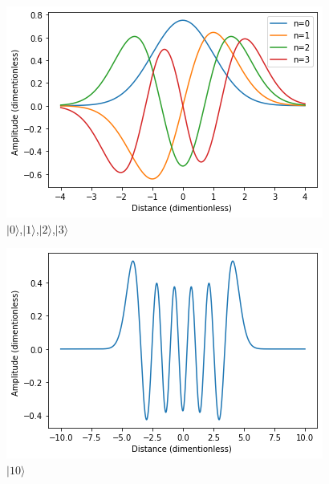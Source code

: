 \documentclass{article}
\begin{document}
\begin{figure}
    \centering
    \includegraphics[width=\textwidth]{10.16a.png}
    \caption{$|0\rangle$,$|1\rangle$,$|2\rangle$,$|3\rangle$}
    \label{fig:enter-label}
\end{figure}
\begin{figure}
    \centering
    \includegraphics[width=\textwidth]{10.16b.png}
    \caption{$|10\rangle$}
    \label{fig:enter-label}
\end{figure}
\end{document}
